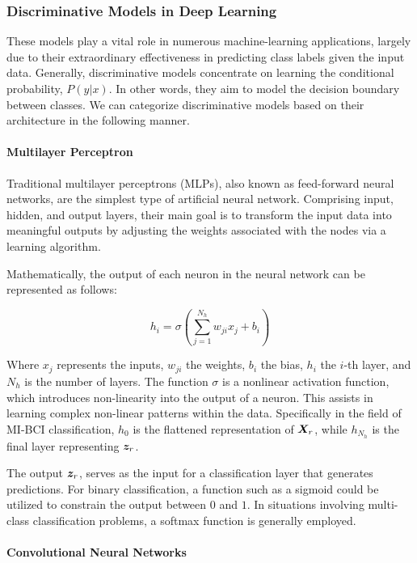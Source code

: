 \subsubsection{Discriminative Models in Deep Learning}

These models play a vital role in numerous machine-learning applications, largely due to their extraordinary effectiveness in predicting class labels given the input data. Generally, discriminative models concentrate on learning the conditional probability, $P(y|x)$. In other words, they aim to model the decision boundary between classes. We can categorize discriminative models based on their architecture in the following manner.

\paragraph{Multilayer Perceptron}

Traditional multilayer perceptrons (MLPs), also known as feed-forward neural networks, are the simplest type of artificial neural network. Comprising input, hidden, and output layers, their main goal is to transform the input data into meaningful outputs by adjusting the weights associated with the nodes via a learning algorithm.

Mathematically, the output of each neuron in the neural network can be represented as follows:

\begin{equation}
h_i = \sigma \left( \sum_{j=1}^{N_h} w_{ji} x_j + b_i \right)
\end{equation}

Where $x_j$ represents the inputs, $w_{ji}$ the weights, $b_i$ the bias, $h_i$ the $i$-th layer, and $N_h$ is the number of layers. The function $\sigma$ is a nonlinear activation function, which introduces non-linearity into the output of a neuron. This assists in learning complex non-linear patterns within the data. Specifically in the field of MI-BCI classification, $h_0$ is the flattened representation of $\bm {X}_r$, while $h_{N_h}$ is the final layer representing $\bm {z}_r$.

The output $\bm {z}_r$, serves as the input for a classification layer that generates predictions. For binary classification, a function such as a sigmoid could be utilized to constrain the output between $0$ and $1$. In situations involving multi-class classification problems, a softmax function is generally employed.

\paragraph{Convolutional Neural Networks}

